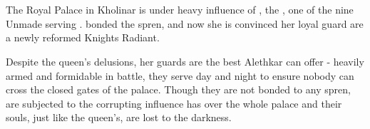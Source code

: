 \section{\npcFractionPalace}
\label{enemyPalace}

The Royal Palace in Kholinar is under heavy influence of \npcYeligNar{}, the \npcYeligNarTitle{}, one of the nine Unmade serving \npcOdium{}. \npcQueen{} bonded the spren, and now she is convinced her loyal guard are a newly reformed Knights Radiant.

Despite the queen's delusions, her guards are the best Alethkar can offer - heavily armed and formidable in battle, they serve day and night to ensure nobody can cross the closed gates of the palace. Though they are not bonded to any spren, \enemyQueensGuard{} are subjected to the corrupting influence \npcYeligNar{} has over the whole palace and their souls, just like the queen's, are lost to the darkness.



\newpage

\newpage

\newpage

\newpage


